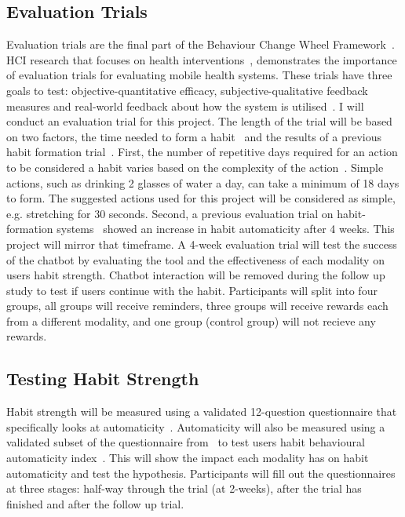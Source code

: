 \subsection{Evaluation Trials}
Evaluation trials are the final part of the Behaviour Change Wheel Framework~\cite{article_behaviour_change_wheel}. HCI research that focuses on health interventions~\cite{article_mhealth}, demonstrates the importance of evaluation trials for evaluating mobile health systems. These trials have three goals to test: objective-quantitative efficacy, subjective-qualitative feedback measures and real-world feedback about how the system is utilised~\cite{article_evaluate_tech_health_behaviour_change}. I will conduct an evaluation trial for this project.\newline
\newline
The length of the trial will be based on two factors, the time needed to form a habit~\cite{article_how_habits_formed_modelling_habit_formation} and the results of a previous habit formation trial~\cite{article_beyond_self_tracking_designing_apps}. First, the number of repetitive days required for an action to be considered a habit varies based on the complexity of the action~\cite{article_how_habits_formed_modelling_habit_formation}. Simple actions, such as drinking 2 glasses of water a day, can take a minimum of 18 days to form. The suggested actions used for this project will be considered as simple, e.g. stretching for 30 seconds. Second, a previous evaluation trial on habit-formation systems~\cite{article_how_habits_formed_modelling_habit_formation} showed an increase in habit automaticity after 4 weeks. This project will mirror that timeframe.\newline
\newline
A 4-week evaluation trial will test the success of the chatbot by evaluating the tool and the effectiveness of each modality on users habit strength. Chatbot interaction will be removed during the follow up study to test if users continue with the habit. Participants will split into four groups, all groups will receive reminders, three groups will receive rewards each from a different modality, and one group (control group) will not recieve any rewards.

\subsection{Testing Habit Strength}
Habit strength will be measured using a validated 12-question questionnaire that specifically looks at automaticity~\cite{article_habit_strength}. Automaticity will also be measured using a validated subset of the questionnaire from~\cite{article_habit_strength} to test users habit behavioural automaticity index~\cite{article_habit_measurement}. This will show the impact each modality has on habit automaticity and test the hypothesis. Participants will fill out the questionnaires~\cite{article_habit_strength, article_habit_measurement} at three stages: half-way through the trial (at 2-weeks), after the trial has finished and after the follow up trial.
